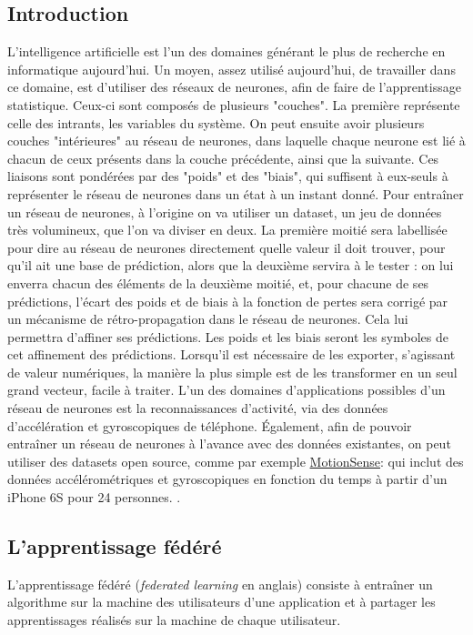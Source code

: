 \documentclass{article}
\begin{document}
\subsection{Introduction}
L'intelligence artificielle est l'un des domaines générant le plus de recherche en informatique aujourd'hui.
Un moyen, assez utilisé aujourd'hui, de travailler dans ce domaine, est d'utiliser des réseaux de neurones, afin de faire de l'apprentissage statistique. Ceux-ci sont composés de plusieurs "couches". La première représente celle des intrants, les variables du système. On peut ensuite avoir plusieurs couches "intérieures" au réseau de neurones, dans laquelle chaque neurone est lié à chacun de ceux présents dans la couche précédente, ainsi que la suivante. Ces liaisons sont pondérées par des "poids" et des "biais", qui suffisent à eux-seuls à représenter le réseau de neurones dans un état à un instant donné.
Pour entraîner un réseau de neurones, à l'origine on va utiliser un dataset, un jeu de données très volumineux, que l'on va diviser en deux. La première moitié sera labellisée pour dire au réseau de neurones directement quelle valeur il doit trouver, pour qu'il ait une base de prédiction, alors que la deuxième servira à le tester : on lui enverra chacun des éléments de la deuxième moitié, et, pour chacune de ses prédictions, l'écart des poids et de biais à la fonction de pertes sera corrigé par un mécanisme de rétro-propagation dans le réseau de neurones. Cela lui permettra d'affiner ses prédictions. Les poids et les biais seront les symboles de cet affinement des prédictions. Lorsqu'il est nécessaire de les exporter, s'agissant de valeur numériques, la manière la plus simple est de les transformer en un seul grand vecteur, facile à traiter. L'un des domaines d'applications possibles d'un réseau de neurones est la reconnaissances d'activité, via des données d'accélération et gyroscopiques de téléphone. Également, afin de pouvoir entraîner un réseau de neurones à l'avance avec des données existantes, on peut utiliser des datasets open source, comme par exemple \underline{MotionSense}: qui inclut des données accélérométriques et gyroscopiques en fonction du temps à partir d'un iPhone 6S pour 24 personnes. \cite{MalekzadehMobileSensorData2019} \cite{MalekzadehPrivacyUtilityPreserving2019}.

\subsection{L'apprentissage fédéré}

L'apprentissage fédéré (\textit{federated learning} en anglais) consiste à entraîner un algorithme sur la machine des utilisateurs d'une application et à partager les apprentissages réalisés sur la machine de chaque utilisateur.
\end{document}
